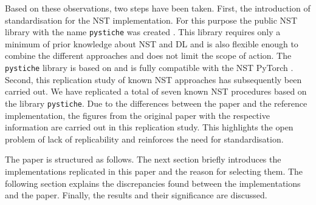 Based on these observations, two steps have been taken. First, the introduction of standardisation for the NST implementation. For this purpose the public NST library with the name \texttt{pystiche} was created \cite{ML2020}. This library requires only a minimum of prior knowledge about NST and DL and is also flexible enough to combine the different approaches and does not limit the scope of action. The \texttt{pystiche} library is based on and is fully compatible with the NST PyTorch \cite{PGM+2019}. Second, this replication study of known NST approaches has subsequently been carried out. We have replicated a total of seven known NST procedures based on the library \texttt{pystiche}. Due to the differences between the paper and the reference implementation, the figures from the original paper with the respective information are carried out in this replication study. This highlights the open problem of lack of replicability and reinforces the need for standardisation.

The paper is structured as follows. The next section briefly introduces the implementations replicated in this paper and the reason for selecting them. The following section explains the discrepancies found between the implementations and the paper. Finally, the results and their significance are discussed.